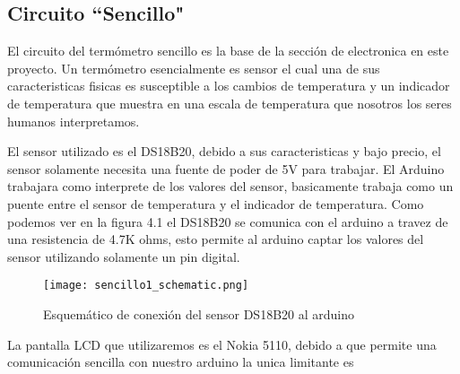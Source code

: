 \subsection{Circuito ``Sencillo"}
	\par 
		El circuito del termómetro sencillo es la base de la sección de electronica en este proyecto. Un termómetro esencialmente es sensor el cual una de sus caracteristicas fisicas es susceptible a los cambios de temperatura y un indicador de temperatura que muestra en una escala de temperatura que nosotros los seres humanos interpretamos.
		
	\par
		El sensor utilizado es el DS18B20, debido a sus caracteristicas y bajo precio, el sensor solamente necesita una fuente de poder de 5V para trabajar. El Arduino trabajara como interprete de los valores del sensor, basicamente trabaja como un puente entre el sensor de temperatura y el indicador de temperatura. Como podemos ver en la figura 4.1 el DS18B20 se comunica con el arduino a travez de una resistencia de 4.7K ohms, esto permite al arduino captar los valores del sensor utilizando solamente un pin digital. 
		
\clearpage
\thispagestyle{plain}

	\begin{figure}[H]
		\centering
		\texttt{[image: sencillo1\_schematic.png]}
		\caption{Esquemático de conexión del sensor DS18B20 al arduino}
	\end{figure}

	\par 
		La pantalla LCD que utilizaremos es el Nokia 5110, debido a que permite una comunicación sencilla con nuestro arduino la unica limitante es 